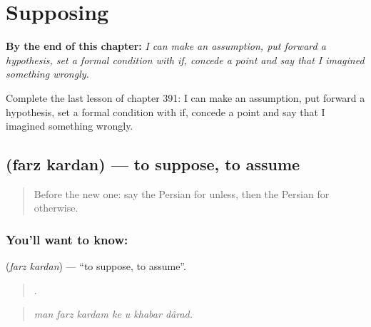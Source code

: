 
\chapter{Supposing}
\label{ch:fa-supposing}

\begin{chapteropening}
\textbf{By the end of this chapter:} \emph{I can make an assumption, put forward a hypothesis, set a formal condition with if, concede a point and say that I imagined something wrongly.}

Complete the last lesson of chapter 391: I can make an assumption, put forward a hypothesis, set a formal condition with if, concede a point and say that I imagined something wrongly.
\end{chapteropening}

\section[\texorpdfstring{\fa{فرض} \fa{کردن} (farz kardan)}{فرض کردن (farz kardan)}]{  (farz kardan) — to suppose, to assume}

\label{lesson:FA-C391-farz-kardan}



\begin{quote}
Before the new one: say the Persian for unless, then the Persian for otherwise.
\end{quote}

\subsection*{You'll want to know:  }
\textbf{ } (\emph{farz kardan}) — \textquotedblleft{}to suppose, to assume\textquotedblright{}.

\begin{quote}
      .
\end{quote}

\begin{quote}
\emph{man farz kardam ke u khabar dârad.}
\end{quote}

